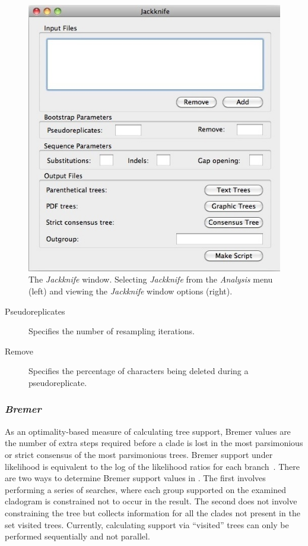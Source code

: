 {\begin{figure}
\begin{minipage}[c]{0.52\textwidth}
\includegraphics[width=\textwidth]{doc/figures/jackknife_window.jpg}
\end{minipage}
\caption{The \emph{Jackknife} window. Selecting \emph{Jackknife} 
from the \emph{Analysis} menu (left) and 
viewing the \emph{Jackknife} window options (right).}
\label{fig:jackknife}
\end{figure}

\begin{description}
\item[Pseudoreplicates] Specifies the number of resampling iterations.
\item[Remove] Specifies the percentage of characters being deleted 
during a pseudoreplicate.
\end{description}

\subsubsection*{\emph{Bremer}}

As an optimality-based measure of calculating tree support, Bremer
values are the number of extra steps required before a clade is
lost in the most parsimonious or strict consensus of the most
parsimonious trees.  Bremer support under likelihood is equivalent
to the log of the likelihood ratios for each branch~\cite{Wheeler2006}.
There are two ways to determine Bremer support values in \poy.  The
first involves performing a series of searches, where each group
supported on the examined cladogram is constrained not to occur in
the result.  The second does not involve constraining the tree but
collects information for all the clades not present in the set
visited trees.  Currently, calculating support via ``visited'' trees
can only be performed sequentially and not parallel.

}
